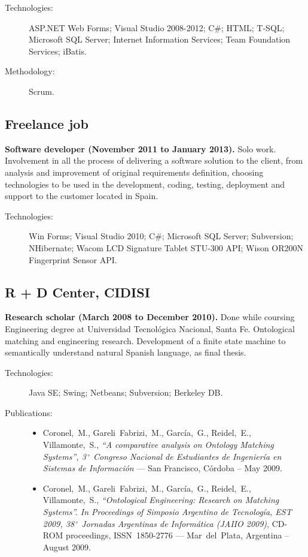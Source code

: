\begin{description}
    \item[Technologies:] ASP.NET Web Forms; Visual Studio 2008-2012; C\#; HTML; T-SQL; Microsoft SQL Server; Internet Information Services; Team Foundation Services; iBatis.
    \item[Methodology:] Scrum.
\end{description}

\subsection*{Freelance job}

\textbf{Software developer (November 2011 to January 2013).} Solo work. Involvement in all the process of delivering a software solution to the client, from analysis and improvement of original requirements definition, choosing technologies to be used in the development, coding, testing, deployment and support to the customer located in Spain.

\begin{description}
    \item[Technologies:] Win Forms; Visual Studio 2010; C\#; Microsoft SQL Server; Subversion; NHibernate; Wacom LCD Signature Tablet STU-300 API; Wison OR200N Fingerprint Sensor API.
\end{description}

\subsection*{R + D Center, CIDISI}

\textbf{Research scholar (March 2008 to December 2010).} Done while coursing Engineering degree at Universidad Tecnológica Nacional, Santa Fe. Ontological matching and engineering research. Development of a finite state machine to semantically understand natural Spanish language, as final thesis.
\begin{description}
    \item[Technologies:] Java SE; Swing; Netbeans; Subversion; Berkeley DB.
    \item[Publications:] \hfill
    \begin{itemize}
		\item Coronel,~M., Gareli~Fabrizi,~M., García,~G., Reidel,~E., Villamonte,~S., \textit{``A comparative analysis on Ontology Matching Systems'', 3$\,^\circ$ Congreso Nacional de Estudiantes de Ingeniería en Sistemas de Información} --- San Francisco, Córdoba -- May 2009.
		\item Coronel,~M., Gareli~Fabrizi,~M., García,~G., Reidel,~E., Villamonte,~S., \textit{``Ontological Engineering: Research on Matching Systems''. In Proceedings of Simposio Argentino de Tecnología, EST 2009, 38$\,^\circ$ Jornadas Argentinas de Informática (JAIIO 2009)}, CD-ROM proceedings, ISSN~1850-2776 --- Mar~del~Plata, Argentina -- August 2009.
	\end{itemize}
\end{description}

